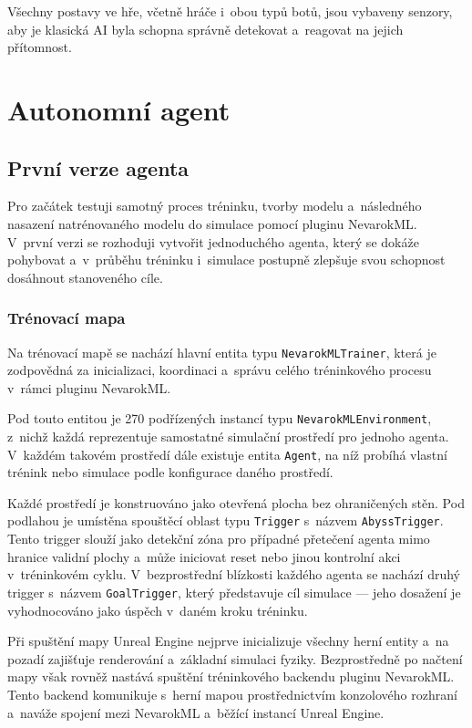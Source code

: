 Všechny postavy ve hře, včetně hráče i~obou typů botů, jsou vybaveny senzory, aby je klasická AI byla schopna správně detekovat a~reagovat na jejich přítomnost.

\newpage

\section{Autonomní agent}
\subsection{První verze agenta}
Pro začátek testuji samotný proces tréninku, tvorby modelu a~následného nasazení natrénovaného modelu do simulace pomocí pluginu NevarokML. V~první verzi se rozhoduji vytvořit jednoduchého agenta, který se dokáže pohybovat a~v~průběhu tréninku i~simulace postupně zlepšuje svou schopnost dosáhnout stanoveného cíle.

\subsubsection{Trénovací mapa}

Na trénovací mapě se nachází hlavní entita typu \texttt{NevarokMLTrainer}, která je zodpovědná za inicializaci, koordinaci a~správu celého tréninkového procesu v~rámci pluginu NevarokML. 

Pod touto entitou je 270 podřízených instancí typu \texttt{NevarokMLEnvironment}, z~nichž každá reprezentuje samostatné simulační prostředí pro jednoho agenta. V~každém takovém prostředí dále existuje entita \texttt{Agent}, na níž probíhá vlastní trénink nebo simulace podle konfigurace daného prostředí.

Každé prostředí je konstruováno jako otevřená plocha bez ohraničených stěn. Pod podlahou je umístěna spouštěcí oblast typu \texttt{Trigger} s~názvem \texttt{AbyssTrigger}. Tento trigger slouží jako detekční zóna pro případné přetečení agenta mimo hranice validní plochy a~může iniciovat reset nebo jinou kontrolní akci v~tréninkovém cyklu. V~bezprostřední blízkosti každého agenta se nachází druhý trigger s~názvem \texttt{GoalTrigger}, který představuje cíl simulace — jeho dosažení je vyhodnocováno jako úspěch v~daném kroku tréninku.

Při spuštění mapy Unreal Engine nejprve inicializuje všechny herní entity a~na pozadí zajišťuje renderování a~základní simulaci fyziky. Bezprostředně po načtení mapy však rovněž nastává spuštění tréninkového backendu pluginu NevarokML. Tento backend komunikuje s~herní mapou prostřednictvím konzolového rozhraní a~naváže spojení mezi NevarokML a~běžící instancí Unreal Engine. 

